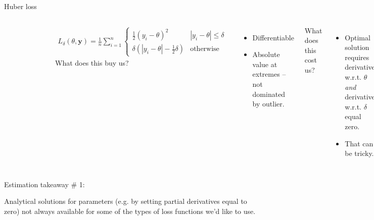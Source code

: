 \documentclass[aspectratio=169]{beamer}
\begin{document}
\begin{frame}{Huber loss}

\begin{columns}
\begin{figure}
\includegraphics[width=0.85\textwidth]{huber}
\caption*{}
\end{figure}
\vspace{-10mm}
\begin{align*}
L_\delta(\theta, \textbf{y}) = \frac{1}{n} \sum_{i=1}^n 
\begin{cases}
    \frac{1}{2}(y_i - \theta)^2 &  | y_i - \theta | \le \delta \\
    \delta ( |y_i - \theta| - \frac{1}{2}\delta ) & \text{otherwise}
\end{cases}
\end{align*}
What does this buy us?
\pause
\begin{itemize}
\item Differentiable
\item Absolute value at extremes -- not dominated by outlier.
\end{itemize}

\vspace{5mm}
\pause
What does this cost us?
\pause
\begin{itemize}
\item Optimal solution requires derivative w.r.t. $\theta$ \textit{and} derivative w.r.t. $\delta$ equal zero.  
\item That can be tricky.
\end{itemize}
\end{columns}
\end{frame}

\begin{frame}{Estimation takeaway \# 1: }

Analytical solutions for parameters (e.g. by setting partial derivatives equal to zero) not always available for some of the types of loss functions we'd like to use.
\end{frame}
\end{document}
